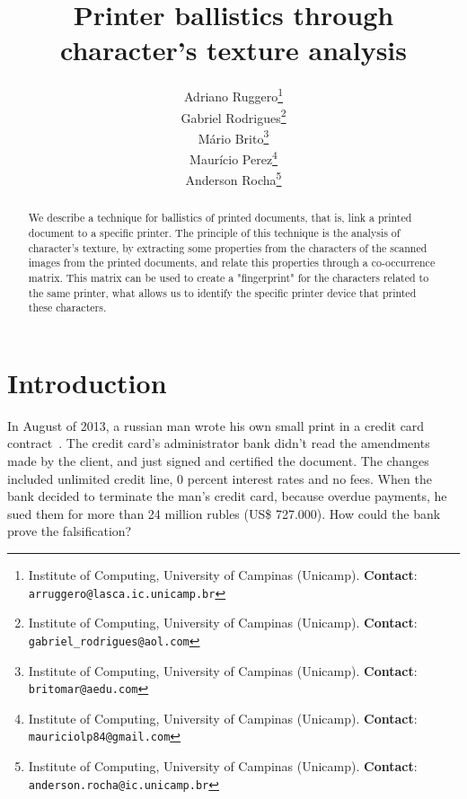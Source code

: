 \documentclass[10pt,twocolumn,letterpaper]{article}
\begin{document}
\title{Printer ballistics through character's texture analysis}
\author{Adriano Ruggero\thanks{Institute of Computing, University of Campinas (Unicamp). \textbf{Contact}: \tt\small{arruggero@lasca.ic.unicamp.br}}\\
Gabriel Rodrigues\thanks{Institute of Computing, University of Campinas (Unicamp). \textbf{Contact}: \tt\small{gabriel\_rodrigues@aol.com}}\\
Mário Brito\thanks{Institute of Computing, University of Campinas (Unicamp). \textbf{Contact}:
\tt\small{britomar@aedu.com}}\\
Maurício Perez\thanks{Institute of Computing, University of Campinas (Unicamp). \textbf{Contact}:
\tt\small{mauriciolp84@gmail.com}}\\
Anderson Rocha\thanks{Institute of Computing, University of Campinas (Unicamp). \textbf{Contact}: \tt\small{anderson.rocha@ic.unicamp.br}}
}

\maketitle
\begin{abstract}
We describe a technique for ballistics of printed documents, that is, link a printed document to a specific printer. The principle of this technique is the analysis of character's texture, by extracting some properties from the characters of the scanned images from the printed documents, and relate this properties through a co-occurrence matrix. This matrix can be used to create a "fingerprint" for the characters related to the same printer, what allows us to identify the specific printer device that printed these characters.
\end{abstract}

\section{Introduction}
In August of 2013, a russian man wrote his own small print in a credit card contract~\cite{RT}. The credit card's administrator bank didn't read the amendments made by the client, and just signed and certified the document. The changes included unlimited credit line, 0 percent interest rates and no fees. When the bank decided to terminate the man's credit card, because overdue payments, he sued them for more than 24 million rubles (US\$ 727.000). How could the bank prove the falsification?
\end{document}
